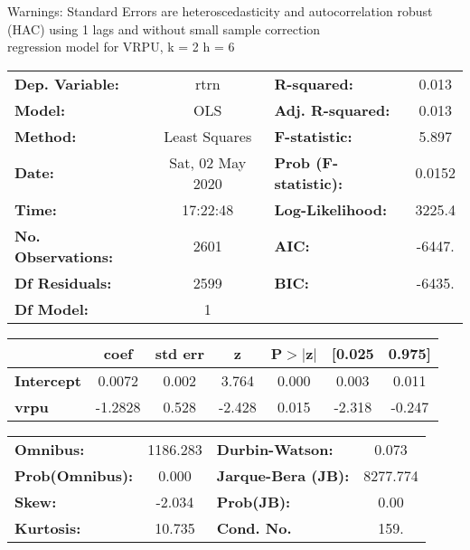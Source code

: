 Warnings: \newline
 [1] Standard Errors are heteroscedasticity and autocorrelation robust (HAC) using 1 lags and without small sample correction\\ 

regression model for VRPU, k = 2 h = 6\begin{center}
\begin{tabular}{lclc}
\toprule
\textbf{Dep. Variable:}    &       rtrn       & \textbf{  R-squared:         } &     0.013   \\
\textbf{Model:}            &       OLS        & \textbf{  Adj. R-squared:    } &     0.013   \\
\textbf{Method:}           &  Least Squares   & \textbf{  F-statistic:       } &     5.897   \\
\textbf{Date:}             & Sat, 02 May 2020 & \textbf{  Prob (F-statistic):} &   0.0152    \\
\textbf{Time:}             &     17:22:48     & \textbf{  Log-Likelihood:    } &    3225.4   \\
\textbf{No. Observations:} &        2601      & \textbf{  AIC:               } &    -6447.   \\
\textbf{Df Residuals:}     &        2599      & \textbf{  BIC:               } &    -6435.   \\
\textbf{Df Model:}         &           1      & \textbf{                     } &             \\
\bottomrule
\end{tabular}
\begin{tabular}{lcccccc}
                   & \textbf{coef} & \textbf{std err} & \textbf{z} & \textbf{P$> |$z$|$} & \textbf{[0.025} & \textbf{0.975]}  \\
\midrule
\textbf{Intercept} &       0.0072  &        0.002     &     3.764  &         0.000        &        0.003    &        0.011     \\
\textbf{vrpu}      &      -1.2828  &        0.528     &    -2.428  &         0.015        &       -2.318    &       -0.247     \\
\bottomrule
\end{tabular}
\begin{tabular}{lclc}
\textbf{Omnibus:}       & 1186.283 & \textbf{  Durbin-Watson:     } &    0.073  \\
\textbf{Prob(Omnibus):} &   0.000  & \textbf{  Jarque-Bera (JB):  } & 8277.774  \\
\textbf{Skew:}          &  -2.034  & \textbf{  Prob(JB):          } &     0.00  \\
\textbf{Kurtosis:}      &  10.735  & \textbf{  Cond. No.          } &     159.  \\
\bottomrule
\end{tabular}
\end{center}

